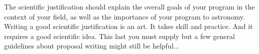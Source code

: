 \documentclass[11pt]{article}
\begin{document}

%

%


\sciencejustification
The scientific justification should explain the overall goals of
your program in the context of your field, as well as the importance
of your program to astronomy.
Writing a good scientific justification is an art.  It takes
skill and practice.  And it requires a good scientific idea.
This last you must supply but a few general guidelines
about proposal writing might still be helpful...
\end{document}
